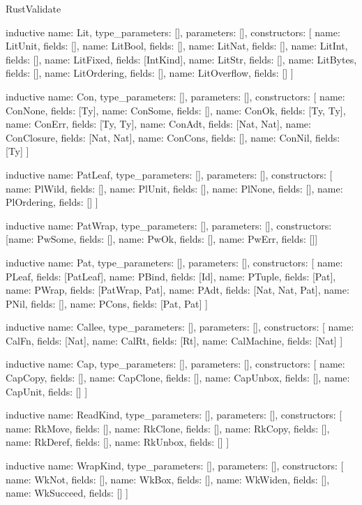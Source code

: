 \begin{lexlean}{RustValidate}
\begin{semanticmodule}
inductive{
  name: Lit,
  type_parameters: [],
  parameters: [],
  constructors: [
    {name: LitUnit, fields: []},
    {name: LitBool, fields: []},
    {name: LitNat, fields: []},
    {name: LitInt, fields: []},
    {name: LitFixed, fields: [IntKind]},
    {name: LitStr, fields: []},
    {name: LitBytes, fields: []},
    {name: LitOrdering, fields: []},
    {name: LitOverflow, fields: []}
  ]
}

inductive{
  name: Con,
  type_parameters: [],
  parameters: [],
  constructors: [
    {name: ConNone, fields: [Ty]},
    {name: ConSome, fields: []},
    {name: ConOk, fields: [Ty, Ty]},
    {name: ConErr, fields: [Ty, Ty]},
    {name: ConAdt, fields: [Nat, Nat]},
    {name: ConClosure, fields: [Nat, Nat]},
    {name: ConCons, fields: []},
    {name: ConNil, fields: [Ty]}
  ]
}

inductive{
  name: PatLeaf,
  type_parameters: [],
  parameters: [],
  constructors: [
    {name: PlWild, fields: []},
    {name: PlUnit, fields: []},
    {name: PlNone, fields: []},
    {name: PlOrdering, fields: []}
  ]
}

inductive{
  name: PatWrap,
  type_parameters: [],
  parameters: [],
  constructors: [{name: PwSome, fields: []}, {name: PwOk, fields: []}, {name: PwErr, fields: []}]
}

inductive{
  name: Pat,
  type_parameters: [],
  parameters: [],
  constructors: [
    {name: PLeaf, fields: [PatLeaf]},
    {name: PBind, fields: [Id]},
    {name: PTuple, fields: [Pat]},
    {name: PWrap, fields: [PatWrap, Pat]},
    {name: PAdt, fields: [Nat, Nat, Pat]},
    {name: PNil, fields: []},
    {name: PCons, fields: [Pat, Pat]}
  ]
}

inductive{
  name: Callee,
  type_parameters: [],
  parameters: [],
  constructors: [
    {name: CalFn, fields: [Nat]},
    {name: CalRt, fields: [Rt]},
    {name: CalMachine, fields: [Nat]}
  ]
}

inductive{
  name: Cap,
  type_parameters: [],
  parameters: [],
  constructors: [
    {name: CapCopy, fields: []},
    {name: CapClone, fields: []},
    {name: CapUnbox, fields: []},
    {name: CapUnit, fields: []}
  ]
}

inductive{
  name: ReadKind,
  type_parameters: [],
  parameters: [],
  constructors: [
    {name: RkMove, fields: []},
    {name: RkClone, fields: []},
    {name: RkCopy, fields: []},
    {name: RkDeref, fields: []},
    {name: RkUnbox, fields: []}
  ]
}

inductive{
  name: WrapKind,
  type_parameters: [],
  parameters: [],
  constructors: [
    {name: WkNot, fields: []},
    {name: WkBox, fields: []},
    {name: WkWiden, fields: []},
    {name: WkSucceed, fields: []}
  ]
}


\end{semanticmodule}
\end{lexlean}
